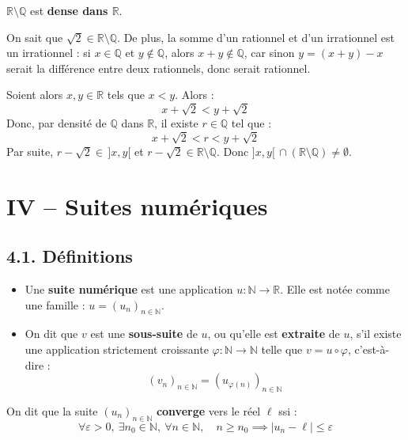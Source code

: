 \documentclass[a4paper,11pt]{article}
\newcommand{\R}{\mathbb{R}}
\newcommand{\N}{\mathbb{N}}
\newcommand{\Q}{\mathbb{Q}}
\newcommand{\mot}[1]{\textcolor{bordeaux}{\textbf{#1}}}
\begin{document}
\begin{corollaire}
$\R \setminus \Q$ est \mot{dense dans $\R$}.
\end{corollaire}

\begin{demonstration}
On sait que $\sqrt{2} \in \R \setminus \Q$. De plus, la somme d'un rationnel et d'un irrationnel est un irrationnel : si $x \in \Q$ et $y \notin \Q$, alors $x + y \notin \Q$, car sinon $y = (x + y) - x$ serait la différence entre deux rationnels, donc serait rationnel.

Soient alors $x, y \in \R$ tels que $x < y$. Alors :
\[
x + \sqrt{2} < y + \sqrt{2}
\]
Donc, par densité de $\Q$ dans $\R$, il existe $r \in \Q$ tel que :
\[
x + \sqrt{2} < r < y + \sqrt{2}
\]
Par suite, $r - \sqrt{2} \in \, ]x, y[$ et $r - \sqrt{2} \in \R \setminus \Q$. Donc $]x, y[ \, \cap (\R \setminus \Q) \neq \emptyset$.
\end{demonstration}

\newpage
\section{IV -- Suites numériques}

\subsection{4.1. Définitions}

\begin{definition}
\begin{itemize}
    \item Une \mot{suite numérique} est une application $u : \N \to \R$. Elle est notée comme une famille : $u = (u_n)_{n \in \N}$.
    \item On dit que $v$ est une \mot{sous-suite} de $u$, ou qu'elle est \mot{extraite} de $u$, s'il existe une application strictement croissante $\varphi : \N \to \N$ telle que $v = u \circ \varphi$, c'est-à-dire :
    \[
    (v_n)_{n \in \N} = (u_{\varphi(n)})_{n \in \N}
    \]
\end{itemize}
\end{definition}

\begin{definition}
On dit que la suite $(u_n)_{n \in \N}$ \mot{converge} vers le réel $\ell$ ssi :
\[
\forall \varepsilon > 0, \ \exists n_0 \in \N, \ \forall n \in \N, \quad n \ge n_0 \implies |u_n - \ell| \le \varepsilon
\]
\end{definition}
\end{document}
